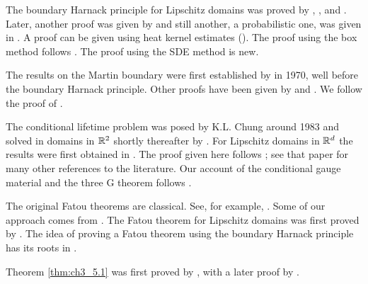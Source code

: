 The boundary Harnack principle for Lipschitz domains was proved by \cite{Dahlberg1977}, \cite{Ancona1978}, and \cite{Wu1978}. Later, another proof was given by \cite{JerisonKenig1982a} and still another, a probabilistic one, was given in \cite{BassBurdzy1990}. A proof can be given using heat kernel estimates (\cite{Banuelos1992}). The proof using the box method follows \cite{BassBurdzy1990}. The proof using the SDE method is new.

The results on the Martin boundary were first established by \cite{HuntWheeden1970} in 1970, well before the boundary Harnack principle. Other proofs have been given by \cite{JerisonKenig1982a} and \cite{BassBurdzy1990}. We follow the proof of \cite{BassBurdzy1990}.

The conditional lifetime problem was posed by K.L. Chung around 1983 and solved in domains in $\mathbb{R}^2$ shortly thereafter by \cite{CranstonMcConnell1983}. For Lipschitz domains in $\mathbb{R}^d$ the results were first obtained in \cite{Cranston1985}. The proof given here follows \cite{BassBurdzy1992}; see that paper for many other references to the literature. Our account of the conditional gauge material and the three G theorem follows \cite{CranstonFabesZhao1988}.

The original Fatou theorems are classical. See, for example, \cite{Doob1984}. Some of our approach comes from \cite{Durrett1984}. The Fatou theorem for Lipschitz domains was first proved by \cite{HuntWheeden1968}. The idea of proving a Fatou theorem using the boundary Harnack principle has its roots in \cite{Doob1984}.

Theorem \ref{thm:ch3_5.1} was first proved by \cite{Dahlberg1977}, with a later proof by \cite{JerisonKenig1982a}.